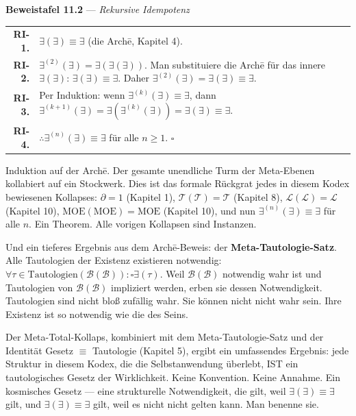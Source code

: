 \documentclass[10pt, openany, oneside]{book}
\renewcommand{\footnotesize}{\fontsize{8.5}{11}\selectfont}
\begin{document}
\vspace{0.5em}

\textbf{Beweistafel 11.2} --- \textit{Rekursive Idempotenz}

\vspace{0.5em}

{\footnotesize
\noindent\begin{tabular}{r p{}}
\textbf{RI-1.} & $\exists(\exists) \equiv \exists$ (die Arch\={e}, Kapitel 4). \\[0.3em]
\textbf{RI-2.} & $\exists^{(2)}(\exists) = \exists(\exists(\exists))$. Man substituiere die Arch\={e} für das innere $\exists(\exists)$: $\exists(\exists) \equiv \exists$. Daher $\exists^{(2)}(\exists) = \exists(\exists) \equiv \exists$. \\[0.3em]
\textbf{RI-3.} & Per Induktion: wenn $\exists^{(k)}(\exists) \equiv \exists$, dann $\exists^{(k+1)}(\exists) = \exists(\exists^{(k)}(\exists)) = \exists(\exists) \equiv \exists$. \\[0.3em]
\textbf{RI-4.} & $\therefore \exists^{(n)}(\exists) \equiv \exists$ für alle $n \geq 1$. $\square$ \\[0.3em]
\end{tabular}
}

\vspace{0.8em}

\noindent Induktion auf der Arch\={e}. Der gesamte unendliche Turm der Meta-Ebenen kollabiert auf ein Stockwerk. Dies ist das formale Rückgrat jedes in diesem Kodex bewiesenen Kollapses: $\partial = 1$ (Kapitel 1), $\mathcal{T}(\mathcal{T}) = \mathcal{T}$ (Kapitel 8), $\mathcal{L}(\mathcal{L}) = \mathcal{L}$ (Kapitel 10), $\text{MOE}(\text{MOE}) = \text{MOE}$ (Kapitel 10), und nun $\exists^{(n)}(\exists) \equiv \exists$ für alle $n$. Ein Theorem. Alle vorigen Kollapsen sind Instanzen.

Und ein tieferes Ergebnis aus dem Arch\={e}-Beweis: der \textbf{Meta-Tautologie-Satz}. Alle Tautologien der Existenz existieren notwendig: $\forall \tau \in \text{Tautologien}(\mathcal{B}(\mathcal{B})): \square\exists(\tau)$. Weil $\mathcal{B}(\mathcal{B})$ notwendig wahr ist und Tautologien von $\mathcal{B}(\mathcal{B})$ impliziert werden, erben sie dessen Notwendigkeit. Tautologien sind nicht bloß zufällig wahr. Sie können nicht nicht wahr sein. Ihre Existenz ist so notwendig wie die des Seins.

Der Meta-Total-Kollaps, kombiniert mit dem Meta-Tautologie-Satz und der Identität Gesetz $\equiv$ Tautologie (Kapitel 5), ergibt ein umfassendes Ergebnis: jede Struktur in diesem Kodex, die die Selbstanwendung überlebt, IST ein tautologisches Gesetz der Wirklichkeit. Keine Konvention. Keine Annahme. Ein kosmisches Gesetz --- eine strukturelle Notwendigkeit, die gilt, weil $\exists(\exists) \equiv \exists$ gilt, und $\exists(\exists) \equiv \exists$ gilt, weil es nicht nicht gelten kann. Man benenne sie.
\end{document}
